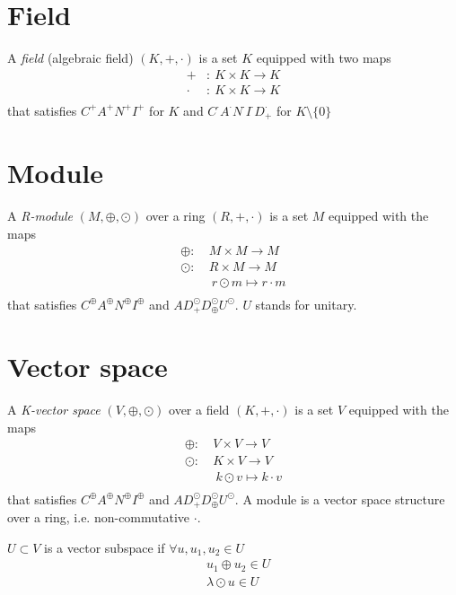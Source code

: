 \documentclass[root.tex]{subfiles}
\begin{document}
\section{Field}
\begin{mydef}
  A \emph{field} (algebraic field) $(K, +, \cdot )$ is a set $K$ equipped with two maps
  \begin{align*}
    +      &:\ K \times K \rightarrow K\\
    \cdot\ &:\ K \times K \rightarrow K\\
  \end{align*}
  that satisfies $C^{+}A^{+}N^{+}I^{+}$ for $K$ and $C^{\cdot}A^{\cdot}N^{\cdot}I^{\cdot}D^{\cdot}_{+}$ for $K\setminus \{0\}$ 
\end{mydef}
\section{Module}
\begin{mydef}
  A \emph{R-module} $(M, \oplus, \odot )$ over a ring $(R, +, \cdot)$ is a set $M$ equipped with the maps
  \begin{align*}
    \oplus      :\ &M \times M \rightarrow M\\
    \odot       :\ &R \times M \rightarrow M\\
                &\ r \odot m \mapsto r\cdot m\\
  \end{align*}
  that satisfies $C^{\oplus}A^{\oplus}N^{\oplus}I^{\oplus}$ and $AD^{\odot}_+D^\odot_{\oplus}U^{\odot}$. $U$ stands for unitary.
\end{mydef}
\section{Vector space}
\begin{mydef}
  A \emph{K-vector space} $(V, \oplus, \odot )$ over a field $(K,+,\cdot)$ is a set $V$ equipped with the maps
  \begin{align*}
    \oplus  :\ &V \times V \rightarrow V\\
    \odot   :\ &K \times V \rightarrow V\\
            &\ k \odot v \mapsto k\cdot v\\
  \end{align*}
  that satisfies $C^{\oplus}A^{\oplus}N^{\oplus}I^{\oplus}$ and $AD^{\odot}_+D^\odot_{\oplus}U^{\odot}$. A module is a vector space structure over a ring, i.e. non-commutative $\cdot$.
\end{mydef}
\begin{mydef}
  $U \subset V$ is a vector subspace if $\forall u, u_1, u_2 \in U$  
  \begin{align*}
    &u_1 \oplus u_2 \in U\\
    &\lambda \odot u \in U
  \end{align*}
\end{mydef}
\end{document}
